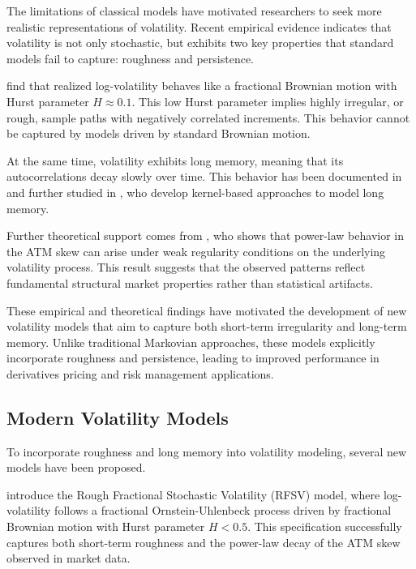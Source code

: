 The limitations of classical models have motivated researchers to seek more realistic representations of volatility. Recent empirical evidence indicates that volatility is not only stochastic, but exhibits two key properties that standard models fail to capture: roughness and persistence.

\citet{GatheralJaissonRosenbaum2018} find that realized log-volatility behaves like a fractional Brownian motion with Hurst parameter $H \approx 0.1$. This low Hurst parameter implies highly irregular, or rough, sample paths with negatively correlated increments. This behavior cannot be captured by models driven by standard Brownian motion.

At the same time, volatility exhibits long memory, meaning that its autocorrelations decay slowly over time. This behavior has been documented in \citet{ComteRenault1998} and further studied in \citet{BennedsenLundePakkanen2021}, who develop kernel-based approaches to model long memory.

Further theoretical support comes from \citet{Fukasawa2017}, who shows that power-law behavior in the ATM skew can arise under weak regularity conditions on the underlying volatility process. This result suggests that the observed patterns reflect fundamental structural market properties rather than statistical artifacts.

These empirical and theoretical findings have motivated the development of new volatility models that aim to capture both short-term irregularity and long-term memory. Unlike traditional Markovian approaches, these models explicitly incorporate roughness and persistence, leading to improved performance in derivatives pricing and risk management applications.


\subsection{Modern Volatility Models} \label{subsec:ModernVolModels}

To incorporate roughness and long memory into volatility modeling, several new models have been proposed.

\citet{GatheralJaissonRosenbaum2018} introduce the Rough Fractional Stochastic Volatility (RFSV) model, where log-volatility follows a fractional Ornstein-Uhlenbeck process driven by fractional Brownian motion with Hurst parameter $H < 0.5$. This specification successfully captures both short-term roughness and the power-law decay of the ATM skew observed in market data.

